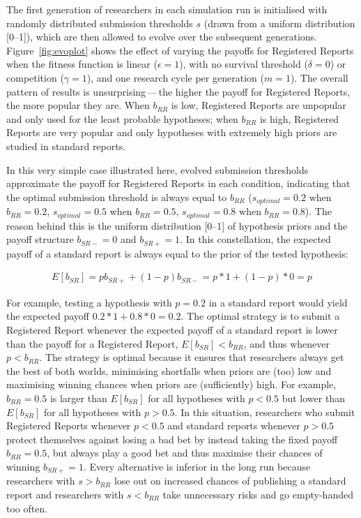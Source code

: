 \documentclass[
  ,man,mask,floatsintext]{apa6}
\begin{document}
The first generation of researchers in each simulation run is initialised with randomly distributed submission thresholds \(s\) (drawn from a uniform distribution {[}0--1{]}), which are then allowed to evolve over the subsequent generations.
Figure~\ref{fig:evoplot} shows the effect of varying the payoffs for Registered Reports when the fitness function is linear (\(\epsilon = 1\)), with no survival threshold (\(\delta = 0\)) or competition (\(\gamma = 1\)), and one research cycle per generation (\(m = 1\)).
The overall pattern of results is unsurprising\(\,\)---\(\,\)the higher the payoff for Registered Reports, the more popular they are.
When \(b_{RR}\) is low, Registered Reports are unpopular and only used for the least probable hypotheses; when \(b_{RR}\) is high, Registered Reports are very popular and only hypotheses with extremely high priors are studied in standard reports.

In this very simple case illustrated here, evolved submission thresholds approximate the payoff for Registered Reports in each condition, indicating that the optimal submission threshold is always equal to \(b_{RR}\) (\(s_{optimal} = 0.2\) when \(b_{RR} = 0.2\), \(s_{optimal} = 0.5\) when \(b_{RR} = 0.5\), \(s_{optimal} = 0.8\) when \(b_{RR} = 0.8\)).
The reason behind this is the uniform distribution {[}0--1{]} of hypothesis priors and the payoff structure \(b_{SR-} = 0\) and \(b_{SR+} = 1\).
In this constellation, the expected payoff of a standard report is always equal to the prior of the tested hypothesis:

\begin{align}
E[b_{SR}] = p b_{SR+} + (1-p)b_{SR-} = p * 1 +  (1-p) * 0 = p
\end{align}

For example, testing a hypothesis with \(p = 0.2\) in a standard report would yield the expected payoff \(0.2 * 1 + 0.8 * 0 = 0.2\).
The optimal strategy is to submit a Registered Report whenever the expected payoff of a standard report is lower than the payoff for a Registered Report, \(E[b_{SR}] < b_{RR}\), and thus whenever \(p < b_{RR}\).
The strategy is optimal because it ensures that researchers always get the best of both worlds, minimising shortfalls when priors are (too) low and maximising winning chances when priors are (sufficiently) high.
For example, \(b_{RR} = 0.5\) is larger than \(E[b_{SR}]\) for all hypotheses with \(p < 0.5\) but lower than \(E[b_{SR}]\) for all hypotheses with \(p > 0.5\).
In this situation, researchers who submit Registered Reports whenever \(p<0.5\) and standard reports whenever \(p>0.5\) protect themselves against losing a bad bet by instead taking the fixed payoff \(b_{RR} = 0.5\), but always play a good bet and thus maximise their chances of winning \(b_{SR+} = 1\).
Every alternative is inferior in the long run because researchers with \(s > b_{RR}\) lose out on increased chances of publishing a standard report and researchers with \(s < b_{RR}\) take unnecessary risks and go empty-handed too often.
\end{document}
